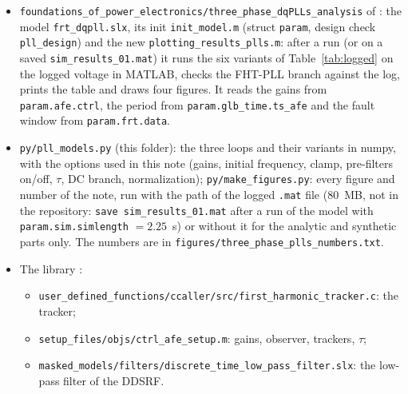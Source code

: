 \documentclass[11pt,a4paper]{scrartcl}
\newcommand{\code}[1]{\texttt{#1}}
\newcommand{\us}{\_\allowbreak}  %
\begin{document}
\begin{onehalfspace}
\begin{itemize}[nosep]
	\item \code{foundations\us of\us power\us electronics/\allowbreak three\us phase\us dqPLLs\us analysis} of \cite{model_repo}: the model \code{frt\_dqpll.slx}, its init \code{init\_model.m} (struct \code{param}, design check \code{pll\_design}) and the new \code{plotting\_results\_plls.m}: after a run (or on a saved \code{sim\_results\_01.mat}) it runs the six variants of Table~\ref{tab:logged} on the logged voltage in MATLAB, checks the FHT-PLL branch against the log, prints the table and draws four figures. It reads the gains from \code{param.afe.ctrl}, the period from \code{param.glb\_time.ts\_afe} and the fault window from \code{param.frt.data}.
	\item \code{py/pll\_models.py} (this folder): the three loops and their variants in numpy, with the options used in this note (gains, initial frequency, clamp, pre-filters on/off, $\tau$, DC branch, normalization); \code{py/make\_figures.py}: every figure and number of the note, run with the path of the logged \code{.mat} file (\num{80}~MB, not in the repository: \code{save sim\_results\_01.mat} after a run of the model with \code{param.sim.simlength} $= 2.25$~s) or without it for the analytic and synthetic parts only. The numbers are in \code{figures/\allowbreak three\us phase\us plls\us numbers.txt}.
	\item The library \cite{library_repo}:
	\begin{itemize}
		\item \code{user\_defined\_functions/ccaller/src/first\_harmonic\_tracker.c}: the tracker;
		\item \code{setup\_files/objs/ctrl\_afe\_setup.m}: gains, observer, trackers, $\tau$;
		\item \code{masked\_models/filters/discrete\_time\_low\_pass\_filter.slx}: the low-pass filter of the DDSRF.
	\end{itemize}
\end{itemize}


\end{onehalfspace}
\end{document}
